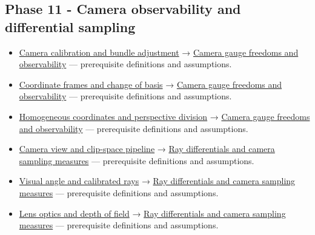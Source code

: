 \subsection{Phase 11 - Camera observability and differential sampling}\label{appendix-4ad47bdd269a-phase-11---camera-observability-and-differential-sampling}

\begin{itemize}
\tightlist
\item
  \hyperref[appendix-3ee9861904d5]{Camera calibration and bundle adjustment} → \hyperref[appendix-113f0267e5f4]{Camera gauge freedoms and observability} --- prerequisite definitions and assumptions.
\item
  \hyperref[appendix-1bae9457dbc3]{Coordinate frames and change of basis} → \hyperref[appendix-113f0267e5f4]{Camera gauge freedoms and observability} --- prerequisite definitions and assumptions.
\item
  \hyperref[appendix-cb3b26862282]{Homogeneous coordinates and perspective division} → \hyperref[appendix-113f0267e5f4]{Camera gauge freedoms and observability} --- prerequisite definitions and assumptions.
\item
  \hyperref[appendix-1c07d64f5e70]{Camera view and clip-space pipeline} → \hyperref[appendix-8c40fad29462]{Ray differentials and camera sampling measures} --- prerequisite definitions and assumptions.
\item
  \hyperref[appendix-7d356c396d1a]{Visual angle and calibrated rays} → \hyperref[appendix-8c40fad29462]{Ray differentials and camera sampling measures} --- prerequisite definitions and assumptions.
\item
  \hyperref[appendix-21f8456e2629]{Lens optics and depth of field} → \hyperref[appendix-8c40fad29462]{Ray differentials and camera sampling measures} --- prerequisite definitions and assumptions.
\end{itemize}

